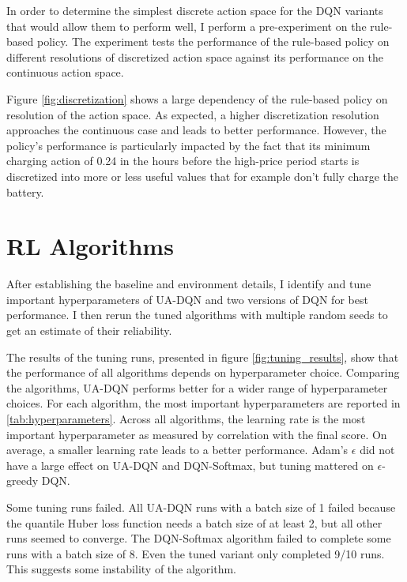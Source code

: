 In order to determine the simplest discrete action space for the DQN variants that would allow them to perform well, I perform a pre-experiment on the rule-based policy.
The experiment tests the performance of the rule-based policy on different resolutions of discretized action space against its performance on the continuous action space.

Figure \ref{fig:discretization} shows a large dependency of the rule-based policy on resolution of the action space.
As expected, a higher discretization resolution approaches the continuous case and leads to better performance.
However, the policy's performance is particularly impacted by the fact that its minimum charging action of 0.24 in the hours before the high-price period starts is discretized into more or less useful values that for example don't fully charge the battery.


\section{RL Algorithms}
After establishing the baseline and environment details, I identify and tune important hyperparameters of UA-DQN and two versions of DQN for best performance.
I then rerun the tuned algorithms with multiple random seeds to get an estimate of their reliability.

The results of the tuning runs, presented in figure \ref{fig:tuning_results}, show that the performance of all algorithms depends on hyperparameter choice.
Comparing the algorithms, UA-DQN performs better for a wider range of hyperparameter choices.
For each algorithm, the most important hyperparameters are reported in \ref{tab:hyperparameters}. Across all algorithms, the learning rate is the most important hyperparameter as measured by correlation with the final score.
On average, a smaller learning rate leads to a better performance.
Adam's $\epsilon$ did not have a large effect on UA-DQN and DQN-Softmax, but tuning mattered on $\epsilon$-greedy DQN.


Some tuning runs failed. All UA-DQN runs with a batch size of 1 failed because the quantile Huber loss function needs a batch size of at least 2, but all other runs seemed to converge.
The DQN-Softmax algorithm failed to complete some runs with a batch size of 8. Even the tuned variant only completed 9/10 runs. This suggests some instability of the algorithm. 

